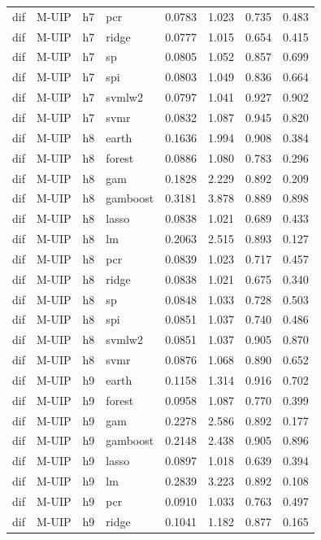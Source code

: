 \begin{ThreePartTable}
\begin{longtable}[t]{llclcccc}
dif & M-UIP & h7 & pcr & 0.0783 & 1.023 & 0.735 & 0.483\\
dif & M-UIP & h7 & ridge & 0.0777 & 1.015 & 0.654 & 0.415\\
dif & M-UIP & h7 & sp & 0.0805 & 1.052 & 0.857 & 0.699\\
dif & M-UIP & h7 & spi & 0.0803 & 1.049 & 0.836 & 0.664\\
dif & M-UIP & h7 & svmlw2 & 0.0797 & 1.041 & 0.927 & 0.902\\
dif & M-UIP & h7 & svmr & 0.0832 & 1.087 & 0.945 & 0.820\\
\addlinespace
dif & M-UIP & h8 & earth & 0.1636 & 1.994 & 0.908 & 0.384\\
dif & M-UIP & h8 & forest & 0.0886 & 1.080 & 0.783 & 0.296\\
dif & M-UIP & h8 & gam & 0.1828 & 2.229 & 0.892 & 0.209\\
dif & M-UIP & h8 & gamboost & 0.3181 & 3.878 & 0.889 & 0.898\\
dif & M-UIP & h8 & lasso & 0.0838 & 1.021 & 0.689 & 0.433\\
dif & M-UIP & h8 & lm & 0.2063 & 2.515 & 0.893 & 0.127\\
dif & M-UIP & h8 & pcr & 0.0839 & 1.023 & 0.717 & 0.457\\
dif & M-UIP & h8 & ridge & 0.0838 & 1.021 & 0.675 & 0.340\\
dif & M-UIP & h8 & sp & 0.0848 & 1.033 & 0.728 & 0.503\\
dif & M-UIP & h8 & spi & 0.0851 & 1.037 & 0.740 & 0.486\\
dif & M-UIP & h8 & svmlw2 & 0.0851 & 1.037 & 0.905 & 0.870\\
dif & M-UIP & h8 & svmr & 0.0876 & 1.068 & 0.890 & 0.652\\
\addlinespace
dif & M-UIP & h9 & earth & 0.1158 & 1.314 & 0.916 & 0.702\\
dif & M-UIP & h9 & forest & 0.0958 & 1.087 & 0.770 & 0.399\\
dif & M-UIP & h9 & gam & 0.2278 & 2.586 & 0.892 & 0.177\\
dif & M-UIP & h9 & gamboost & 0.2148 & 2.438 & 0.905 & 0.896\\
dif & M-UIP & h9 & lasso & 0.0897 & 1.018 & 0.639 & 0.394\\
dif & M-UIP & h9 & lm & 0.2839 & 3.223 & 0.892 & 0.108\\
dif & M-UIP & h9 & pcr & 0.0910 & 1.033 & 0.763 & 0.497\\
dif & M-UIP & h9 & ridge & 0.1041 & 1.182 & 0.877 & 0.165\\

\end{longtable}
\end{ThreePartTable}
